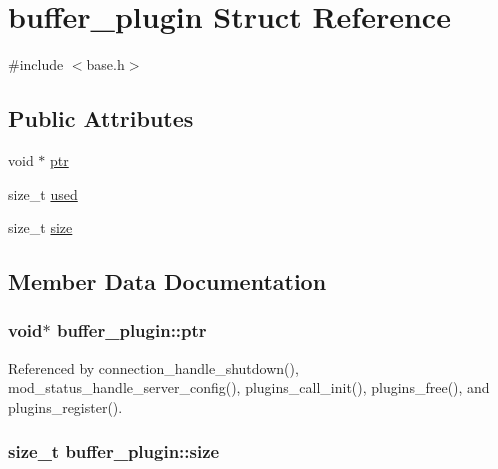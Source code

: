 \hypertarget{structbuffer__plugin}{\section{buffer\-\_\-plugin Struct Reference}
\label{structbuffer__plugin}
}


{\ttfamily \#include $<$base.\-h$>$}

\subsection*{Public Attributes}
\begin{DoxyCompactItemize}
\item 
void $\ast$ \hyperlink{structbuffer__plugin_a9297f867ffe9633240c57c2cc9d8a477}{ptr}
\item 
size\-\_\-t \hyperlink{structbuffer__plugin_ae1edd3748c47e1154f580d97f8a956b0}{used}
\item 
size\-\_\-t \hyperlink{structbuffer__plugin_acf2764e4f4b83bee6fd1c41d91119714}{size}
\end{DoxyCompactItemize}


\subsection{Member Data Documentation}
\hypertarget{structbuffer__plugin_a9297f867ffe9633240c57c2cc9d8a477}{
\subsubsection[{ptr}]{\setlength{\rightskip}{0pt plus 5cm}void$\ast$ buffer\-\_\-plugin\-::ptr}}\label{structbuffer__plugin_a9297f867ffe9633240c57c2cc9d8a477}


Referenced by connection\-\_\-handle\-\_\-shutdown(), mod\-\_\-status\-\_\-handle\-\_\-server\-\_\-config(), plugins\-\_\-call\-\_\-init(), plugins\-\_\-free(), and plugins\-\_\-register().

\hypertarget{structbuffer__plugin_acf2764e4f4b83bee6fd1c41d91119714}{
\subsubsection[{size}]{\setlength{\rightskip}{0pt plus 5cm}size\-\_\-t buffer\-\_\-plugin\-::size}}\label{structbuffer__plugin_acf2764e4f4b83bee6fd1c41d91119714}


